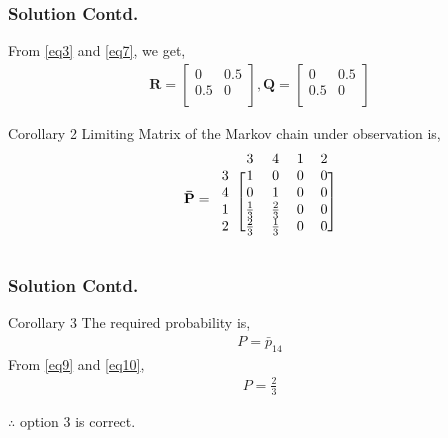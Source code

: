\documentclass{beamer}
\renewcommand{\vec}[1]{\mathbf{#1}}
\let\vec\mathbf
\begin{document}
\begin{frame}
 \frametitle{Solution Contd.}
 From \eqref{eq3} and \eqref{eq7}, we get,
\begin{align}
    \vec{R}=\begin{bmatrix}
    0 & 0.5\\
    0.5 & 0\\
    \end{bmatrix},
    \vec{Q}=\begin{bmatrix}
    0 & 0.5 \\
    0.5 & 0 \\
    \end{bmatrix}
    \label{eq8}
\end{align}     
\begin{block}{Corollary 2}
  Limiting Matrix of the Markov chain under observation is, 
\begin{align} 
    \vec{\bar P}=\begin{blockarray}{ccccc}
&3 &4 &1 &2\\
\begin{block}{c[cccc]}
    3 & 1 & 0 & 0 & 0  \\
    4 & 0 & 1 & 0 & 0  \\
    1 & \frac{1}{3} & \frac{2}{3} & 0 & 0 \\
    2 & \frac{2}{3} & \frac{1}{3} & 0 & 0 \\
   \end{block}
\end{blockarray}
\label{eq9}
\end{align}
\end{block}
\end{frame}

\begin{frame}
  \frametitle{Solution Contd.} 
   \begin{block}{Corollary 3}
       The required probability is,
\begin{align}
P =\bar p_{14}
\label{eq10}
\end{align}
From \eqref{eq9} and \eqref{eq10},
\begin{align}
P=\frac{2}{3}
\end{align}
   \end{block}
$\therefore$ option 3 is correct.   
\end{frame}
\end{document}
